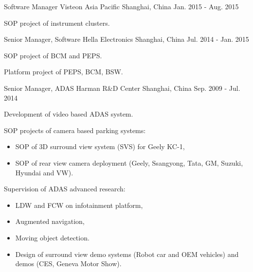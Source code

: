 \documentclass[../cv.tex]{subfiles}
\begin{document}
\begin{cventries}
	\cventry
	{Software Manager} %
	{Visteon Asia Pacific} %
	{Shanghai, China} %
	{Jan. 2015 - Aug. 2015} %
	{
		\begin{cvitems}
			\item SOP project of instrument clusters.
		\end{cvitems}
	}

	\cventry
	{Senior Manager, Software} %
	{Hella Electronics} %
	{Shanghai, China} %
	{Jul. 2014 - Jan. 2015} %
	{
		\begin{cvitems}
			\item SOP project of BCM and PEPS.
			\item Platform project of PEPS, BCM, BSW.
		\end{cvitems}
	}

	\cventry
	{Senior Manager, ADAS} %
	{Harman R\&D Center} %
	{Shanghai, China} %
	{Sep. 2009 - Jul. 2014} %
	{
		\begin{cvitems}
			\item Development of video based ADAS system.
			\item SOP projects of camera based parking systems:
			\begin{itemize}
				\item SOP of 3D surround view system (SVS) for Geely KC-1,
				\item SOP of rear view camera deployment (Geely, Ssangyong, Tata, GM, Suzuki, Hyundai and VW).
			\end{itemize}
			\item Supervision of ADAS advanced research:
			\begin{itemize}
				\item LDW and FCW on infotainment platform,
				\item Augmented navigation,
				\item Moving object detection.
				\item Design of surround view demo systems (Robot car and OEM vehicles) and demos (CES, Geneva Motor Show).
			\end{itemize}
		\end{cvitems}
	}
\end{cventries}
\end{document}
